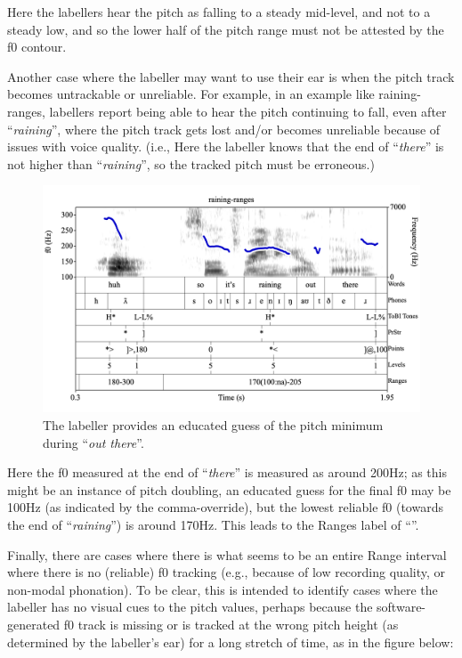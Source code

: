 \documentclass[11pt, twoside]{memoir}
\def\textlabel#1{{\relsize{-.5}\fontspec[Mapping=tex-text]{Roboto Mono}{#1}}}
\def\langtext#1{\textit{#1}}
\begin{document}
Here the labellers hear the pitch as falling to a steady mid-level, and not to a steady low, and so the lower half of the pitch range must not be attested by the f0 contour.

Another case where the labeller may want to use their ear is when the pitch track becomes untrackable or unreliable. For example, in an example like raining-ranges, labellers report being able to hear the pitch continuing to fall, even after “\langtext{raining}”, where the pitch track gets lost and/or becomes unreliable because of issues with voice quality. (i.e., Here the labeller knows that the end of “\langtext{there}” is not higher than “\langtext{raining}”, so the tracked pitch must be erroneous.)

\begin{figure}[H]
\centering
%
\includegraphics[width=.875\linewidth]{Ranges-raining-ranges-adv.png}
%
\caption{The labeller provides an educated guess of the pitch minimum during “\langtext{out there}”.%
\label{fig:raining-ranges Ranges Adv}%
}
\end{figure}

Here the f0 measured at the end of “\langtext{there}” is measured as around 200Hz; as this might be an instance of pitch doubling, an educated guess for the final f0 may be 100Hz (as indicated by the comma-override), but the lowest reliable f0 (towards the end of “\langtext{raining}”) is around 170Hz. This leads to the Ranges label of “\textlabel{170(100:na)-205}”.

Finally, there are cases where there is what seems to be an entire Range interval where there is no (reliable) f0 tracking (e.g., because of low recording quality, or non-modal phonation). To be clear, this is intended to identify cases where the labeller has no visual cues to the pitch values, perhaps because the software-generated f0 track is missing or is tracked at the wrong pitch height (as determined by the labeller’s ear) for a long stretch of time, as in the figure below:
\end{document}
